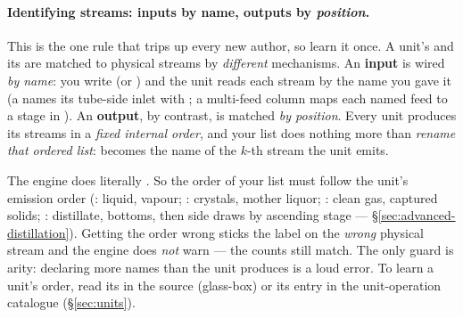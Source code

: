 \documentclass[11pt,a4paper]{article}
\begin{document}
\paragraph{Identifying streams: inputs by name, outputs by \emph{position}.}%
\label{sec:flowsheetDict-streams}
This is the one rule that trips up every new author, so learn it once.
A unit's  and its  are matched to physical
streams by \emph{different} mechanisms.  An \textbf{input} is wired
\emph{by name}: you write  (or )
and the unit reads each stream by the name you gave it (a
 names its tube-side inlet with ; a
multi-feed column maps each named feed to a stage in
).  An \textbf{output}, by contrast, is matched
\emph{by position}.  Every unit produces its streams in a \emph{fixed
internal order}, and your  list does nothing more than
\emph{rename that ordered list}:  becomes the name of
the $k$-th stream the unit emits.

\begin{center}
\end{center}

\noindent The engine does literally .
So the order of your  list must follow the unit's emission
order (: liquid, vapour; :
crystals, mother liquor; : clean gas, captured solids;
: distillate, bottoms, then side draws by
ascending stage --- \S\ref{sec:advanced-distillation}).  Getting the
order wrong sticks the label on the \emph{wrong} physical stream and the
engine does \emph{not} warn --- the counts still match.  The only guard
is arity: declaring more names than the unit produces is a loud error.
To learn a unit's order, read its  in the source
(glass-box) or its entry in the unit-operation catalogue
(\S\ref{sec:units}).
\end{document}
